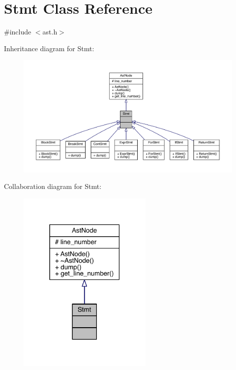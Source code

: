 \hypertarget{class_stmt}{}\section{Stmt Class Reference}
\label{class_stmt}


{\ttfamily \#include $<$ast.\+h$>$}



Inheritance diagram for Stmt\+:\nopagebreak
\begin{figure}[H]
\begin{center}
\leavevmode
\includegraphics[width=350pt]{class_stmt__inherit__graph}
\end{center}
\end{figure}


Collaboration diagram for Stmt\+:\nopagebreak
\begin{figure}[H]
\begin{center}
\leavevmode
\includegraphics[width=186pt]{class_stmt__coll__graph}
\end{center}
\end{figure}
